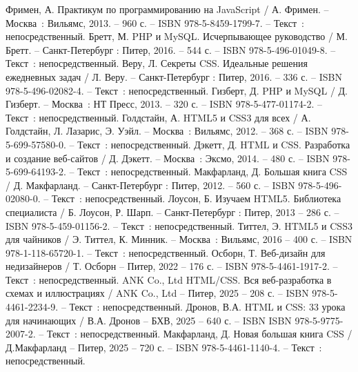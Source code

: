
\begin{thebibliography}{9}

     Фримен, А. Практикум по программированию на JavaScript / А. Фримен. – Москва~: Вильямс, 2013. – 960 с. – ISBN 978-5-8459-1799-7. – Текст~: непосредственный.
     Бретт, М. PHP и MySQL. Исчерпывающее руководство / М. Бретт. – Санкт-Петербург : Питер, 2016. – 544 с. – ISBN 978-5-496-01049-8. – Текст~: непосредственный.
     Веру, Л. Секреты CSS. Идеальные решения ежедневных задач / Л. Веру. – Санкт-Петербург : Питер, 2016. – 336 с. – ISBN 978-5-496-02082-4. – Текст~: непосредственный.
    	Гизберт, Д. PHP и MySQL / Д. Гизберт. – Москва~: НТ Пресс, 2013. – 320 с. – ISBN 978-5-477-01174-2. – Текст~: непосредственный.
		Голдстайн, А. HTML5 и CSS3 для всех / А. Голдстайн, Л. Лазарис, Э. Уэйл. – Москва~: Вильямс, 2012. – 368 с. – ISBN 978-5-699-57580-0. – Текст~: непосредственный.
		Дэкетт, Д. HTML и CSS. Разработка и создание веб-сайтов / Д. Дэкетт. – Москва~: Эксмо, 2014. – 480 с. – ISBN 978-5-699-64193-2. – Текст~: непосредственный.
		Макфарланд, Д. Большая книга CSS / Д. Макфарланд. – Санкт-Петербург : Питер, 2012. – 560 с. – ISBN 978-5-496-02080-0. – Текст~: непосредственный.
		Лоусон, Б. Изучаем HTML5. Библиотека специалиста / Б. Лоусон, Р. Шарп. – Санкт-Петербург : Питер, 2013 – 286 с. – ISBN 978-5-459-01156-2. – Текст~: непосредственный.
		Титтел, Э. HTML5 и CSS3 для чайников / Э. Титтел, К. Минник. – Москва~: Вильямс, 2016 – 400 с. – ISBN 978-1-118-65720-1. – Текст~: непосредственный.    
		Осборн, Т. Веб-дизайн для недизайнеров / Т. Осборн – Питер, 2022 – 176 с. – ISBN 978-5-4461-1917-2. – Текст~: непосредственный.    
		ANK Co., Ltd  HTML/CSS. Вся веб-разработка в схемах и иллюстрациях  / ANK Co., Ltd –   Питер, 2025 – 208 с. – ISBN 
	978-5-4461-2234-9. – Текст~: непосредственный.    
		Дронов, В.А. HTML и CSS: 33 урока для начинающих / В.А. Дронов – БХВ, 2025 – 640 с. – ISBN ISBN
	978-5-9775-2007-2. – Текст~: непосредственный.    
		Макфарланд, Д. Новая большая книга CSS  / Д.Макфарланд  – Питер, 2025 – 720 с. – ISBN 
	978-5-4461-1140-4. – Текст~: непосредственный.
\end{thebibliography}
